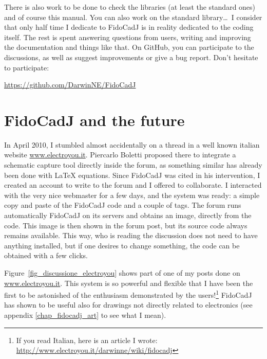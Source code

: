 \documentclass[10pt,a4paper,twoside]{scrreprt}
\begin{document}
There is also work to be done to check the libraries (at least
the standard ones) and of course this manual.%
You can also work on the standard library\dots\
I consider that only half time I dedicate to FidoCadJ is in reality dedicated to the coding itself. The rest is spent answering questions from users, writing and improving the documentation and things like that.
On GitHub\index{GitHub}, you can participate to the discussions, as well as suggest improvements or give a bug report. Don't hesitate to participate:

\href{https://github.com/DarwinNE/FidoCadJ}{https://github.com/DarwinNE/FidoCadJ}

\section{FidoCadJ and the future}

In April 2010, I stumbled almost accidentally on a thread in a well known italian website \href{http://www.electroyou.it}{www.electroyou.it}. Piercarlo Boletti proposed there to integrate a schematic capture tool directly inside the forum, as something similar has already been done with \LaTeX{} equations. Since FidoCadJ was cited in his intervention, I created an account to write to the forum and I offered to collaborate. I interacted with the very nice webmaster for a few days, and the system was ready: a simple copy and paste of the FidoCadJ code and a couple of tags. The forum runs automatically FidoCadJ on its servers and obtains an image, directly from the code. This image is then shown in the forum post, but its source code always remains available. This way, who is reading the discussion does not need to have anything installed, but if one desires to change something, the code can be obtained with a few clicks.

Figure~\ref{fig_discussione_electroyou} shows part of one of my posts done on  \href{http://www.electroyou.it}{www.electroyou.it}. This system is so powerful and flexible that I have been the first to be astonished of the enthusiasm demonstrated by the users!\footnote{If you read Italian, here is an article I wrote:\\ \href{http://www.electroyou.it/darwinne/wiki/fidocadj}{http://www.electroyou.it/darwinne/wiki/fidocadj}  } FidoCadJ has shown to be useful also for drawings not directly related to electronics (see appendix \ref{chap_fidocadj_art} to see what I mean).
\end{document}
